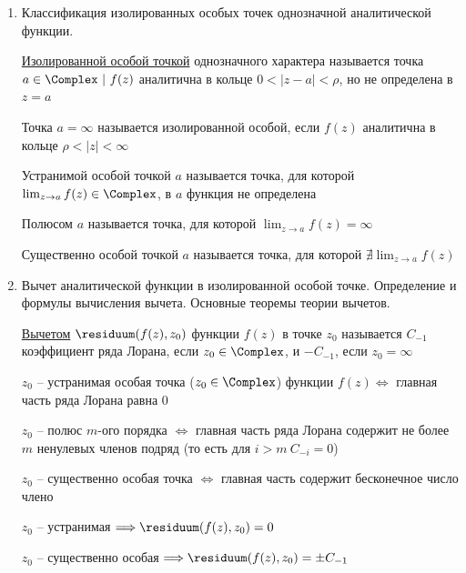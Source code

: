 \documentclass[12pt]{article}
\begin{document}
\begin{enumerate}
    \item Классификация изолированных особых точек однозначной аналитической функции.

    \Defs \hyperlink{isolated_special_point}{Изолированной особой точкой} однозначного характера называется точка $a \in \Complex \ | \ f(z)$ аналитична в кольце $0 < |z - a| < \rho$, но не определена в $z = a$

    \Defs Точка $a = \infty$ называется изолированной особой, если $f(z)$ аналитична в кольце $\rho < |z| < \infty$

    \Defs Устранимой особой точкой $a$ называется точка, для которой $\lim_{z \to a} f(z) \in \Complex$, в $a$ функция не определена

    Полюсом $a$ называется точка, для которой $\lim_{z \to a} f(z) = \infty$

    Существенно особой точкой $a$ называется точка, для которой $\nexists \lim_{z \to a} f(z)$

    \item Вычет аналитической функции в изолированной особой точке. Определение и формулы вычисления вычета. Основные теоремы теории вычетов.

    \Defs \hyperlink{residuum}{Вычетом} $\residuum(f(z), z_0)$ функции $f(z)$ в точке $z_0$ называется $C_{-1}$ коэффициент ряда Лорана, если $z_0 \in \Complex$, и $-C_{-1}$, если $z_0 = \infty$

    \begin{MyTheorem}
         $z_0$ -- устранимая особая точка ($z_0 \in \Complex$) функции $f(z) \Longleftrightarrow$ главная часть ряда Лорана равна 0
    \end{MyTheorem}
    
    \begin{MyTheorem}
         $z_0$ -- полюс $m$-ого порядка $\Longleftrightarrow$ главная часть ряда Лорана содержит не более $m$ ненулевых членов подряд (то есть для $i > m \ C_{-i} = 0$) 
    \end{MyTheorem}

    \begin{MyTheorem}
         $z_0$ -- существенно особая точка $\Longleftrightarrow$ главная часть содержит бесконечное число члено
    \end{MyTheorem}

    \Notas $z_0$ -- устранимая $\Longrightarrow \residuum(f(z), z_0) = 0$
    
    $z_0$ -- существенно особая $\Longrightarrow \residuum(f(z), z_0) = \pm C_{-1}$
    

\end{enumerate}
\end{document}

